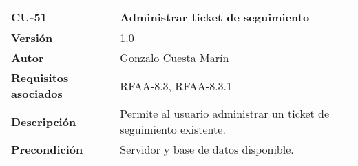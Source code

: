 \begin{longtable}[]{@{}ll@{}}
\toprule
\begin{minipage}[b]{0.26\columnwidth}\raggedright
\textbf{CU-51}\strut
\end{minipage} & \begin{minipage}[b]{0.68\columnwidth}\raggedright
\textbf{Administrar ticket de seguimiento}\strut
\end{minipage}\tabularnewline
\midrule
\endhead
\begin{minipage}[t]{0.26\columnwidth}\raggedright
\textbf{Versión}\strut
\end{minipage} & \begin{minipage}[t]{0.68\columnwidth}\raggedright
1.0\strut
\end{minipage}\tabularnewline
\begin{minipage}[t]{0.26\columnwidth}\raggedright
\textbf{Autor}\strut
\end{minipage} & \begin{minipage}[t]{0.68\columnwidth}\raggedright
Gonzalo Cuesta Marín\strut
\end{minipage}\tabularnewline
\begin{minipage}[t]{0.26\columnwidth}\raggedright
\textbf{Requisitos asociados}\strut
\end{minipage} & \begin{minipage}[t]{0.68\columnwidth}\raggedright
RFAA-8.3, RFAA-8.3.1\strut
\end{minipage}\tabularnewline
\begin{minipage}[t]{0.26\columnwidth}\raggedright
\textbf{Descripción}\strut
\end{minipage} & \begin{minipage}[t]{0.68\columnwidth}\raggedright
Permite al usuario administrar un ticket de seguimiento existente.\strut
\end{minipage}\tabularnewline
\begin{minipage}[t]{0.26\columnwidth}\raggedright
\textbf{Precondición}\strut
\end{minipage} & \begin{minipage}[t]{0.68\columnwidth}\raggedright
Servidor y base de datos disponible.


\end{minipage}
\end{longtable}
